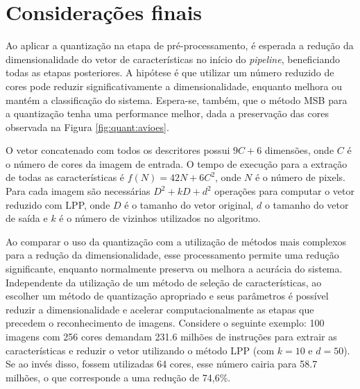 \section{Considerações finais}

Ao aplicar a quantização na etapa de pré-processamento, é esperada a redução da dimensionalidade do vetor de características no início do \textit{pipeline}, beneficiando todas as etapas posteriores. A hipótese é que utilizar um número reduzido de cores pode reduzir significativamente a dimensionalidade, enquanto melhora ou mantém a classificação do sistema. Espera-se, também, que o método MSB para a quantização tenha uma performance melhor, dada a preservação das cores observada na Figura \ref{fig:quant:avioes}.

O vetor concatenado com todos os descritores possui $9C + 6$ dimensões, onde $C$ é o número de cores da imagem de entrada. O tempo de execução para a extração de todas as características é $f(N) = 42N + 6C^2$, onde $N$ é o número de pixels. Para cada imagem são necessárias $D^2 + kD + d^2$ operações para computar o vetor reduzido com LPP, onde $D$ é o tamanho do vetor original, $d$ o tamanho do vetor de saída e $k$ é o número de vizinhos utilizados no algoritmo.

Ao comparar o uso da quantização com a utilização de métodos mais complexos para a redução da dimensionalidade, esse processamento permite uma redução significante, enquanto normalmente preserva ou melhora a acurácia do sistema. Independente da utilização de um método de seleção de características, ao escolher um método de quantização apropriado e seus parâmetros é possível reduzir a dimensionalidade e acelerar computacionalmente as etapas que precedem o reconhecimento de imagens. Considere o seguinte exemplo: 100 imagens com 256 cores demandam 231.6 milhões de instruções para extrair as características e reduzir o vetor utilizando o método LPP (com $k = 10$ e $d = 50$). Se ao invés disso, fossem utilizadas 64 cores, esse número cairia para 58.7 milhões, o que corresponde a uma redução de 74,6\%.

